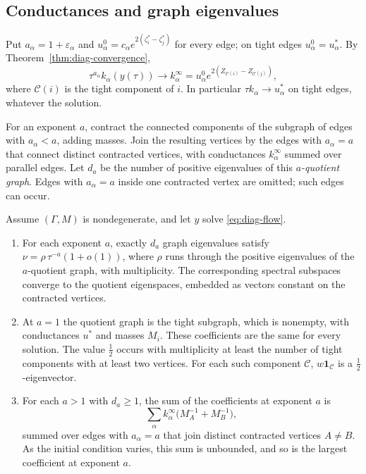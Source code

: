 \subsection{Conductances and graph eigenvalues}

Put $a_\alpha=1+\varepsilon_\alpha$ and
$u^0_\alpha=c_\alpha e^{2(\zeta^*_i-\zeta^*_j)}$ for every edge; on tight
edges $u^0_\alpha=u^*_\alpha$. By
Theorem~\ref{thm:diag-convergence},
\begin{equation}\label{eq:edge-asymptotics}
 \tau^{a_\alpha}k_\alpha(y(\tau))\longrightarrow
 k^\infty_\alpha=u^0_\alpha e^{2(Z_{\mathcal C(i)}-Z_{\mathcal C(j)})},
\end{equation}
where $\mathcal C(i)$ is the tight component of $i$. In particular
$\tau k_\alpha\to u^*_\alpha$ on tight edges, whatever the solution.

For an exponent $a$, contract the connected components of the subgraph of
edges with $a_\alpha<a$, adding masses. Join the resulting vertices by the
edges with $a_\alpha=a$ that connect distinct contracted vertices, with
conductances $k^\infty_\alpha$ summed over parallel edges. Let $d_a$ be the number
of positive eigenvalues of this \emph{$a$-quotient graph}. Edges with
$a_\alpha=a$ inside one contracted vertex are omitted; such edges can
occur.

\begin{theorem}\label{thm:diag-spectrum}
Assume $(\Gamma,M)$ is nondegenerate, and let $y$ solve \eqref{eq:diag-flow}.
\begin{enumerate}
\item For each exponent $a$, exactly $d_a$ graph eigenvalues satisfy
 $\nu=\rho\,\tau^{-a}(1+o(1))$, where $\rho$ runs through the positive
 eigenvalues of the $a$-quotient graph, with multiplicity. The
 corresponding spectral subspaces converge to the quotient eigenspaces,
 embedded as vectors constant on the contracted vertices.
\item At $a=1$ the quotient graph is the tight subgraph, which is
 nonempty, with conductances $u^*$ and masses $M_i$. These coefficients are the same for every
 solution. The value $\frac12$ occurs with multiplicity at least the number
 of tight components with at least two vertices. For each such component $\mathcal C$,
 $w\mathbf 1_{\mathcal C}$ is a $\frac12$-eigenvector.
\item For each $a>1$ with $d_a\ge1$, the sum of the coefficients at exponent $a$
 is
 \[
  \sum_{\alpha}k^\infty_\alpha\bigl(M_A^{-1}+M_B^{-1}\bigr),
 \]
 summed over edges with $a_\alpha=a$ that join distinct contracted vertices
 $A\ne B$. As the initial condition varies, this sum is unbounded, and so is
 the largest coefficient at exponent $a$.
\end{enumerate}
\end{theorem}

